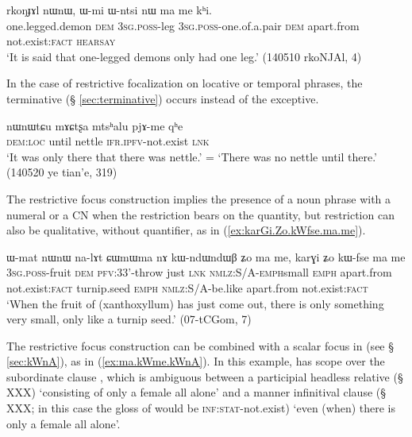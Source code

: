   \begin{exe}
\ex  \label{ex:Wmi.Wntsi.ma.me}
\gll  rkoŋɟɤl nɯnɯ, ɯ-mi ɯ-ntsi nɯ ma me kʰi.   \\
one.legged.demon \textsc{dem} \textsc{3sg}.\textsc{poss}-leg \textsc{3sg}.\textsc{poss}-one.of.a.pair \textsc{dem} apart.from not.exist:\textsc{fact} \textsc{hearsay} \\
\glt  `It is said that one-legged demons only had one leg.' (140510 rkoNJAl, 4)
  \end{exe}
  
In the case of restrictive focalization on locative or temporal phrases,   the terminative  (§ \ref{sec:terminative}) occurs instead of the exceptive.
  
\begin{exe}
\ex  \label{ex:nWnWtCu.mACtsxa.pjAme}
\gll  nɯnɯtɕu mɤɕtʂa mtsʰalu pjɤ-me qʰe \\
\textsc{dem}:\textsc{loc} until nettle  \textsc{ifr.ipfv}-not.exist \textsc{lnk} \\
\glt `It was only there that there was nettle.' =  `There was no nettle until there.' (140520 ye tian'e, 319)
\end{exe}
    
The restrictive focus construction implies the presence of a noun phrase with a numeral or a CN when the restriction bears on the quantity, but restriction can also be qualitative, without quantifier, as in (\ref{ex:karGi.Zo.kWfse.ma.me}).

\begin{exe}
\ex \label{ex:karGi.Zo.kWfse.ma.me}
 \gll   ɯ-mat nɯnɯ na-lɤt ɕɯmɯma nɤ kɯ-ndɯ\redp{}ndɯβ ʑo ma me, karɣi ʑo kɯ-fse ma me  \\
 \textsc{3sg}.\textsc{poss}-fruit \textsc{dem} \textsc{pfv}:3\fl{}3'-throw just \textsc{lnk}  \textsc{nmlz}:S/A-\textsc{emph}\redp{}small \textsc{emph} apart.from not.exist:\textsc{fact} turnip.seed \textsc{emph} \textsc{nmlz}:S/A-be.like apart.from not.exist:\textsc{fact} \\
 \glt  `When the fruit of (xanthoxyllum) has just come out, there is only something very small, only like a turnip seed.'  (07-tCGom, 7)
  \end{exe}
  
The restrictive focus construction can be combined with a scalar focus in  (see §  \ref{sec:kWnA}), as in (\ref{ex:ma.kWme.kWnA}). In this example,  has scope over the subordinate clause , which is ambiguous between a participial headless relative (§ XXX) `consisting of only a female all alone' and a manner infinitival clause (§ XXX; in this case the gloss of  would be \textsc{inf}:\textsc{stat}-not.exist) `even (when) there is only a female all alone'.

